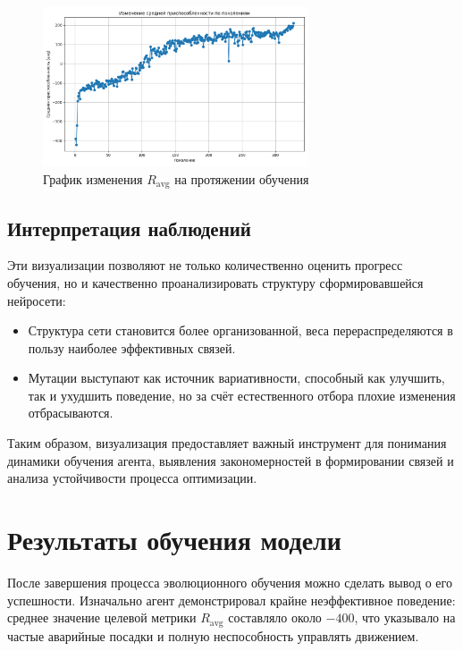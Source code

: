 \documentclass[a4paper,12pt]{article}
\begin{document}
\begin{figure}[H]
	\centering
	\includegraphics[width=0.7\textwidth]{images/avg_fitness_graph.png}
	\caption{График изменения $R_{\text{avg}}$ на протяжении обучения}
	\label{fig:struct_screenshot}
\end{figure}

\subsection{Интерпретация наблюдений}

Эти визуализации позволяют не только количественно оценить прогресс обучения, но и качественно проанализировать структуру сформировавшейся нейросети:
\begin{itemize}
    \item Структура сети становится более организованной, веса перераспределяются в пользу наиболее эффективных связей.
    \item Мутации выступают как источник вариативности, способный как улучшить, так и ухудшить поведение, но за счёт естественного отбора плохие изменения отбрасываются.
\end{itemize}

Таким образом, визуализация предоставляет важный инструмент для понимания динамики обучения агента, выявления закономерностей в формировании связей и анализа устойчивости процесса оптимизации.



\newpage


\section{Результаты обучения модели}

После завершения процесса эволюционного обучения можно сделать вывод о его успешности. Изначально агент демонстрировал крайне неэффективное поведение: среднее значение целевой метрики $R_{\text{avg}}$ составляло около $-400$, что указывало на частые аварийные посадки и полную неспособность управлять движением.
\end{document}
